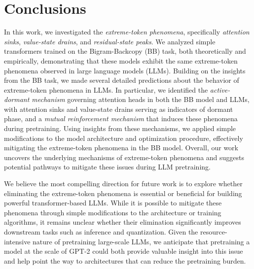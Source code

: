 \section{Conclusions} \label{sec:conclusion}

In this work, we investigated the \textit{extreme-token phenomena}, specifically \textit{attention sinks}, \textit{value-state drains}, and \textit{residual-state peaks}. We analyzed simple transformers trained on the Bigram-Backcopy (BB) task, both theoretically and empirically, demonstrating that these models exhibit the same extreme-token phenomena observed in large language models (LLMs). Building on the insights from the BB task, we made several detailed predictions about the behavior of extreme-token phenomena in LLMs. In particular, we identified the \textit{active-dormant mechanism} governing attention heads in both the BB model and LLMs, with attention sinks and value-state drains serving as indicators of dormant phase, and a \textit{mutual reinforcement mechanism} that induces these phenomena during pretraining. Using insights from these mechanisms, we applied simple modifications to the model architecture and optimization procedure, effectively mitigating the extreme-token phenomena in the BB model. Overall, our work uncovers the underlying mechanisms of extreme-token phenomena and suggests potential pathways to mitigate these issues during LLM pretraining.

We believe the most compelling direction for future work is to explore whether eliminating the extreme-token phenomena is essential or beneficial for building powerful transformer-based LLMs. While it is possible to mitigate these phenomena through simple modifications to the architecture or training algorithms, it remains unclear whether their elimination significantly improves downstream tasks such as inference and quantization. Given the resource-intensive nature of pretraining large-scale LLMs, we anticipate that pretraining a model at the scale of GPT-2 could both provide valuable insight into this issue and help point the way to architectures that can reduce the pretraining burden. 

